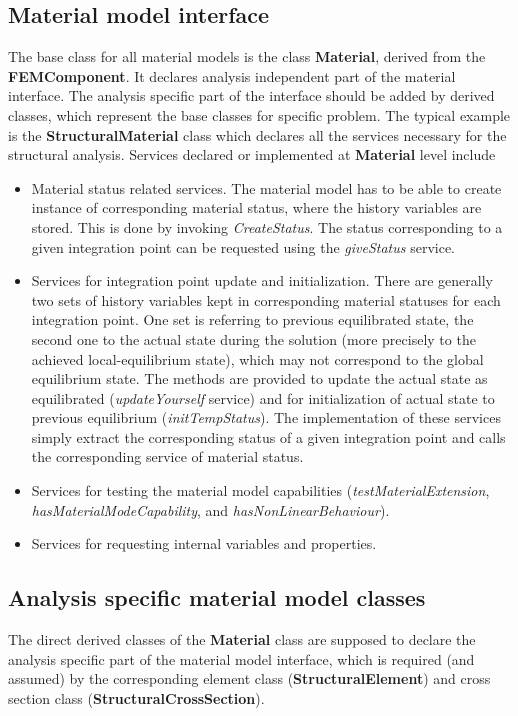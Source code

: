 \documentclass[a4paper]{article}
\newcommand{\class}[1]{{\bf #1}}
\newcommand{\service}[1]{{\em #1}}
\begin{document}
 \subsection{Material model interface}
 The base class for all material models is the class \class{Material},
 derived from the \class{FEMComponent}. It declares analysis independent
 part of the material interface. The analysis specific part of
 the interface should be added by derived classes, which represent the base
 classes for specific problem. The typical example is
 the \class{StructuralMaterial} class which declares all the services
 necessary for the structural analysis.
 Services declared or implemented at \class{Material} level include
 \begin{itemize}
 \item
 Material status related services. The material model has to be able to
 create instance of corresponding material status, where the history
 variables are stored. This is done by invoking \service{CreateStatus}.
 The status corresponding to a given integration point can be requested
 using the \service{giveStatus} service. 
 \item
 Services for integration point update and initialization. There are
 generally two sets of 
 history variables kept in corresponding material statuses for each
 integration point. One set is referring to previous equilibrated
 state, the second one to the actual state during the solution (more precisely to 
 the achieved local-equilibrium state), which may not
 correspond to the global equilibrium state. The methods are provided to update
 the actual state as equilibrated (\service{updateYourself} service) and for 
 initialization of actual state to previous equilibrium
 (\service{initTempStatus}). The implementation of these services
 simply extract the corresponding status of a given integration point and
 calls the corresponding service of material status. 
 \item
 Services for testing the material model capabilities
 (\service{testMaterialExtension}, \service{hasMaterialModeCapability},
 and \service{hasNonLinearBehaviour}).
 \item
 Services for requesting internal variables and properties.
 \end{itemize}

 \subsection{Analysis specific material model classes}
 The direct derived classes of the \class{Material} class are supposed
 to declare the analysis specific
 part of the material model interface, which is required (and assumed)
 by the corresponding
 element class (\class{StructuralElement}) and cross section class
 (\class{StructuralCrossSection}).
\end{document}
